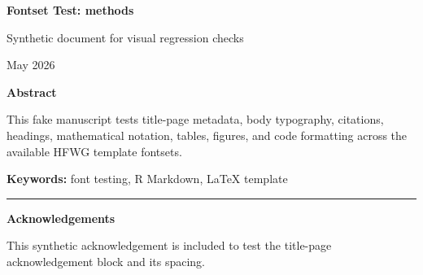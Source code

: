 \documentclass[12pt]{article}
\newif\ifhfwganon
\begin{document}
\begin{titlepage}
\thispagestyle{empty}

\vspace*{0.14\textheight}
\begin{center}


{\LARGE\bfseries Fontset Test: methods\par}

\vspace{0.25em}
{\large Synthetic document for visual regression checks\par}

\vspace{2em}

\begin{singlespace}
{\normalsize

\hfwgauthorblock

\par\vspace{2\baselineskip}
\hfwgseriesblock

\ifhfwganon\else
\vspace{0.5em}
{\small May 2026}\par
\fi

}
\end{singlespace}


\vspace{2em}

\begin{minipage}{0.8\textwidth}
\small\singlespacing
\textbf{Abstract}\par\vspace{0.25em}
This fake manuscript tests title-page metadata, body typography,
citations, headings, mathematical notation, tables, figures, and code
formatting across the available HFWG template fontsets.
\par\vspace{1em}
\noindent\textbf{Keywords: }font testing, R Markdown, LaTeX template
\end{minipage}

\vfill

\ifhfwganon\else
\begin{minipage}{0.8\textwidth}
\footnotesize\singlespacing
\noindent\rule{0.3\textwidth}{0.4pt}\par
\textbf{Acknowledgements}\par
This synthetic acknowledgement is included to test the title-page
acknowledgement block and its spacing.
\end{minipage}
\fi

\end{center}
\end{titlepage}
\fi\fi
\fi\fi
\end{document}
